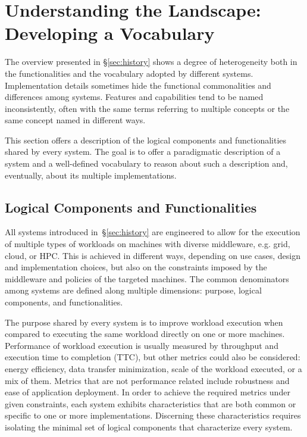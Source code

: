 \documentclass{sig-alternate}
\begin{document}
\section{Understanding the Landscape: Developing a Vocabulary}
\label{sec:understanding}

The overview presented in \S\ref{sec:history} shows a degree of heterogeneity
both in the functionalities and the vocabulary adopted by different \pilotjob
systems. Implementation details sometimes hide the functional commonalities and
differences among \pilotjob systems. Features and capabilities tend to be named
inconsistently, often with the same terms referring to multiple concepts or the
same concept named in different ways.

This section offers a description of the logical components and functionalities
shared by every \pilotjob system. The goal is to offer a paradigmatic
description of a \pilotjob system and a well-defined vocabulary to reason about
such a description and, eventually, about its multiple implementations.


\subsection{Logical Components and Functionalities}
\label{sec:compsandfuncs}

All \pilotjob systems introduced in~\S\ref{sec:history} are engineered to allow
for the execution of multiple types of workloads on machines with diverse
middleware, e.g. grid, cloud, or HPC. This is achieved in different ways,
depending on use cases, design and implementation choices, but also on the
constraints imposed by the middleware and policies of the targeted machines. The
common denominators among \pilotjob systems are defined along multiple
dimensions: purpose, logical components, and functionalities.

The purpose shared by every \pilotjob system is to improve workload execution
when compared to executing the same workload directly on one or more
machines.  Performance of workload execution is
usually measured by throughput and execution time to completion (TTC), but other
metrics could also be considered: energy efficiency, data transfer minimization,
scale of the workload executed, or a mix of them. Metrics that are not
performance related include robustness and ease of application deployment.  In
order to achieve the required metrics under given constraints, each
\pilotjob system exhibits characteristics that are both common or specific to
one or more implementations. Discerning these characteristics requires isolating
the minimal set of logical components that characterize every \pilotjob system.
\end{document}
